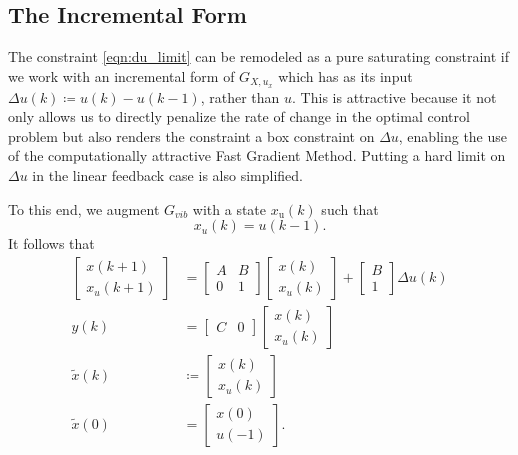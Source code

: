 \documentclass[journal,twocolumn,twoside]{IEEEtran}
\newcommand{\xd}{\ensuremath{\tilde x }\xspace}
\newcommand{\x}{\ensuremath{x }\xspace}
\newcommand{\y}{\ensuremath{y} \xspace}
\begin{document}
\subsection{The Incremental Form}\label{sec:incremental}
The constraint \eqref{eqn:du_limit} can be remodeled as a pure saturating constraint if we work with an incremental form of \(G_{X,u_x}\) which has as its input \({\Delta u(k)\coloneqq u(k)-u(k-1)}\), rather than \(u\). This is attractive because it not only allows us to directly penalize the rate of change in the optimal control problem but also renders the constraint a box constraint on $\Delta u$, enabling the use of the computationally attractive Fast Gradient Method. Putting a hard limit on $\Delta u$ in the linear feedback case is also simplified.

To this end, we augment \(G_{vib}\) with a state \(\x_{\text{u}}(k)\) such that
\begin{equation*}
  \x_u(k) = u(k-1).
\end{equation*}
It follows that
\begin{subequations}
\begin{align}
  \begin{bmatrix}\x(k+1)\\\x_u(k+1)\end{bmatrix}
  &=
    \begin{bmatrix}
      A & B\\ 0 & 1
    \end{bmatrix}
    \begin{bmatrix}\x(k)\\\x_u(k)\end{bmatrix}
    +
    \begin{bmatrix}
      B\\1
    \end{bmatrix}
  \Delta u(k) \label{eqn:deltadyn} \\
  \y(k) & = \begin{bmatrix}C & 0\end{bmatrix}\begin{bmatrix}\x(k)\\\x_u(k)\end{bmatrix}\\
    \xd(k)& \coloneqq
    \begin{bmatrix}\x(k)\\\x_u(k) \end{bmatrix}\\
  \xd(0) & = \begin{bmatrix}\x(0)\\u(-1)\end{bmatrix}. \label{eqn:x0_aug}
\end{align}\label{eqn:ssdelta}%
\end{subequations}
\end{document}

